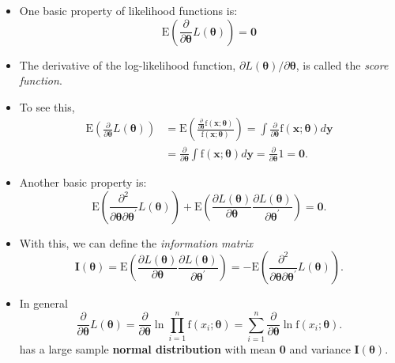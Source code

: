 \documentclass[]{book}
\begin{document}
\begin{itemize}
\item
  One basic property of likelihood functions is: \[\label{E11:ScoreZero}
  \mathrm{E} \left( \frac{ \partial}{\partial \boldsymbol \theta}
  L(\boldsymbol \theta) \right) = \mathbf 0\]
\item
  The derivative of the log-likelihood function,
  \(\partial L(\boldsymbol \theta)/\partial \boldsymbol \theta\), is
  called the \emph{score function}.
\item
  To see this, \[\begin{aligned}
  \mathrm{E} \left( \frac{ \partial}{\partial \boldsymbol \theta} L(\boldsymbol \theta) \right)
  &= \mathrm{E} \left( \frac{\frac{\partial}{\partial \boldsymbol \theta}\mathrm{f}(\mathbf{x};\boldsymbol \theta)}{\mathrm{f}(\mathbf{x};\boldsymbol \theta )}  \right)
  = \int\frac{\partial}{\partial \boldsymbol \theta} \mathrm{f}(\mathbf{x};\boldsymbol \theta ) d \mathbf y \\
  &= \frac{\partial}{\partial \boldsymbol \theta} \int \mathrm{f}(\mathbf{x};\boldsymbol \theta ) d \mathbf y
  = \frac{\partial}{\partial \boldsymbol \theta} 1 = \mathbf 0.\end{aligned}\]
\item
  Another basic property is: \[
  \mathrm{E} \left( \frac{ \partial^2}{\partial \boldsymbol \theta
  \partial \boldsymbol \theta^{\prime}} L(\boldsymbol \theta) \right)
  + \mathrm{E} \left( \frac{ \partial L(\boldsymbol \theta)}{\partial
  \boldsymbol \theta} \frac{ \partial L(\boldsymbol \theta)}{\partial
  \boldsymbol \theta^{\prime}}
   \right) = \mathbf 0.\]
\item
  With this, we can define the \emph{information matrix} \[
  \mathbf{I}(\boldsymbol \theta) = \mathrm{E} \left( \frac{ \partial
  L(\boldsymbol \theta)}{\partial \boldsymbol \theta} \frac{ \partial
  L(\boldsymbol \theta)}{\partial \boldsymbol \theta^{\prime}}
   \right) = -\mathrm{E} \left( \frac{ \partial^2}{\partial \boldsymbol \theta
  \partial \boldsymbol \theta^{\prime}} L(\boldsymbol \theta) \right).\]
\item
  In general
  \[\frac{ \partial}{\partial \boldsymbol \theta} L(\boldsymbol \theta)
  =\frac{ \partial}{\partial \boldsymbol \theta} \ln \prod_{i=1}^n
  \mathrm{f}(x_i;\boldsymbol \theta ) =\sum_{i=1}^n \frac{
  \partial}{\partial \boldsymbol \theta}
  \ln \mathrm{f}(x_i;\boldsymbol \theta ).\] has a large sample
  \textbf{normal distribution} with mean \textbf{0} and variance
  \(\mathbf{I}(\boldsymbol \theta)\).
\end{itemize}
\end{document}
